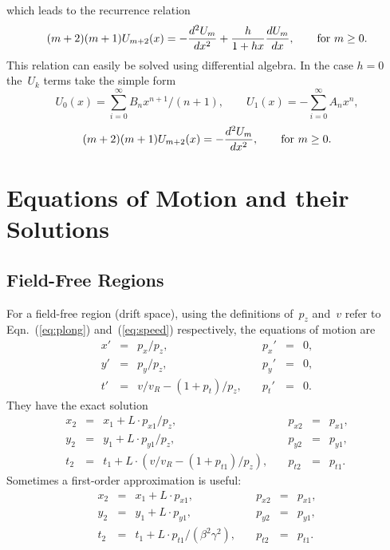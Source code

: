 \documentclass{report}
\begin{document}
which leads to the recurrence relation
\begin{equation}
  (m+2)(m+1)U_{m+2}(x) =
    -\frac{d^2U_m}{dx^2} + \frac{h}{1+hx}\frac{dU_m}{dx},
  \qquad \hbox{for $m\ge 0.$}
\end{equation}
This relation can easily be solved using differential algebra.
In the case $h=0$ the~$U_k$ terms take the simple form
\begin{equation}
  U_0(x)=\sum_{i=0}^\infty B_n x^{n+1} / (n + 1),
  \qquad
  U_1(x)=-\sum_{i=0}^\infty A_n x^n,
\end{equation}
\begin{equation}
  (m+2)(m+1)U_{m+2}(x)=-\frac{d^2U_m}{dx^2},
  \qquad \hbox{for $m\ge 0.$}
\end{equation}


\clearpage
\section{Equations of Motion and their Solutions}
\label{sec:motion}


\subsection{Field-Free Regions}
For a field-free region (drift space),
using the definitions of~$p_z$ and~$v$ refer to Eqn.~(\ref{eq:plong})
and~(\ref{eq:speed}) respectively, the equations of motion are
\begin{equation}
  \begin{array}{lcllcl}
    x'&=&p_x/p_z,                 & p_x'&=&0, \\
    y'&=&p_y/p_z,                 & p_y'&=&0, \\
    t'&=&v/v_R-(1+p_t)/p_z, \quad & p_t'&=&0.
  \end{array}
\end{equation}
They have the exact solution
\begin{equation}
  \begin{array}{lcllcl}
    x_2&=&x_1+L\cdot p_{x1}/p_z,                   & p_{x2}&=&p_{x1}, \\
    y_2&=&y_1+L\cdot p_{y1}/p_z,                   & p_{y2}&=&p_{y1}, \\
    t_2&=&t_1+L\cdot (v/v_R-(1+p_{t1})/p_z), \quad & p_{t2}&=&p_{t1}.
  \end{array}
\end{equation}
Sometimes a first-order approximation is useful:
\begin{equation}
  \begin{array}{lcllcl}
    x_2&=&x_1+L\cdot p_{x1}, & p_{x2}&=&p_{x1}, \\
    y_2&=&y_1+L\cdot p_{y1}, & p_{y2}&=&p_{y1}, \\
    t_2&=&t_1+L\cdot p_{t1}/(\beta^2\gamma^2), \quad & p_{t2}&=&p_{t1}.
  \end{array}
\end{equation}
\end{document}
